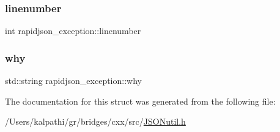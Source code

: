 \mbox{\label{structrapidjson__exception_a9c0263f853d8a17911e29cae66708e67}} 
\subsubsection{\texorpdfstring{linenumber}{linenumber}}
{\footnotesize\ttfamily int rapidjson\+\_\+exception\+::linenumber}

\mbox{\label{structrapidjson__exception_a6b432b89bd7052332bc923f274249e1e}} 
\subsubsection{\texorpdfstring{why}{why}}
{\footnotesize\ttfamily std\+::string rapidjson\+\_\+exception\+::why}



The documentation for this struct was generated from the following file\+:\begin{DoxyCompactItemize}
\item 
/\+Users/kalpathi/gr/bridges/cxx/src/\mbox{\hyperlink{_j_s_o_nutil_8h}{J\+S\+O\+Nutil.\+h}}\end{DoxyCompactItemize}

